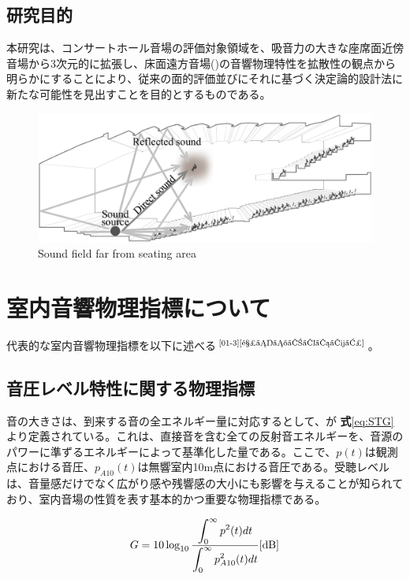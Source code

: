 \subsection{研究目的}
本研究は、コンサートホール音場の評価対象領域を、吸音力の大きな座席面近傍音場から3次元的に拡張し、床面遠方音場()の音響物理特性を拡散性の観点から明らかにすることにより、従来の面的評価並びにそれに基づく決定論的設計法に新たな可能性を見出すことを目的とするものである。
\begin{figure}[htbp]
    \centering
    \includegraphics[keepaspectratio,scale=0.6]{01_att/kuchu.pdf}
    \caption{\hspace{1mm}Sound field far from seating area}
    \label{fig:座席面遠方音場}
\end{figure}

\newpage
\section{室内音響物理指標について}
代表的な室内音響物理指標を以下に述べる$^{\text{\cite{01-3}}{\text{\cite{響きのパラメータ}}}}$。

\subsection{音圧レベル特性に関する物理指標}
音の大きさは、到来する音の全エネルギー量に対応するとして、\STG が \textbf{式}\ref{eq:STG}より定義されている。これは、直接音を含む全ての反射音エネルギーを、音源のパワーに準ずるエネルギーによって基準化した量である。ここで、$p(t)$は観測点における音圧、$p_{A10}(t)$は無響室内10m点における音圧である。受聴レベルは、音量感だけでなく広がり感や残響感の大小にも影響を与えることが知られており、室内音場の性質を表す基本的かつ重要な物理指標である。

\begin{equation}
  \label{eq:STG}
  G = 10\log_{10}{\frac{\displaystyle\int_0^{\infty}p^2(t)dt}{\displaystyle\int_0^{\infty}p_{A10}^2(t)dt}} \textrm{[dB]}
\end{equation}

